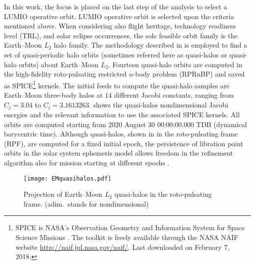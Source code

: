 In this work, the focus is placed on the last step of the analysis to select a LUMIO operative orbit. LUMIO operative orbit is selected upon the criteria mentioned above. When considering also flight heritage, \eg technology readiness level (TRL), and solar eclipse occurrences, the sole feasible orbit family is the Earth--Moon $L_2$ halo family. The methodology described in \cite{deitos2017asr} is employed to find a set of quasi-periodic halo orbits (sometimes referred here as quasi-halos or quasi-halo orbits) about Earth--Moon $L_2$. Fourteen quasi-halo orbits are computed in the high-fidelity roto-pulsating restricted $n$-body problem (RPRnBP) and saved as SPICE\footnote{SPICE is NASA's Observation Geometry and Information System for Space Science Missions \cite{acton1996ancillary,acton2018look}. The toolkit is freely available through the NASA NAIF website \url{http://naif.jpl.nasa.gov/naif/}. Last downloaded on February $7$, 2018.} kernels. The initial feeds to compute the quasi-halo samples are Earth--Moon three-body halos at $14$ different Jacobi constants, ranging from $C_j = 3.04$ to $C_j = 3.1613263$.  shows the quasi-halos nondimensional Jacobi energies and the relevant information to use the associated SPICE kernels. All orbits are computed starting from $2020$ August $30$ $00$:$00$:$00.000$ TDB (dynamical barycentric time). Although quasi-halos, shown in  in the roto-pulsating frame (RPF), are computed for a fixed initial epoch, the persistence of libration point orbits in the solar system ephemeris model allows freedom in the refinement algorithm also for mission starting at different epochs \cite{deitos2017asr}.
%
\begin{figure*}[t!]
	\centering
	\texttt{[image: EMquasihalos.pdf]}
	\caption{Projection of Earth--Moon $L_2$ quasi-halos in the roto-pulsating frame. (adim.\ stands for nondimensional)}
	\label{fig:EMquasihalos}
\end{figure*}
%

